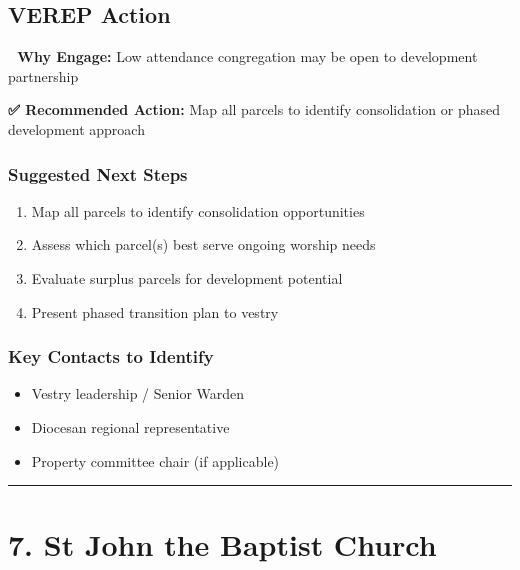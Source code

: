 \documentclass[
  letterpaper,
  DIV=11,
  numbers=noendperiod,
  oneside]{scrreprt}
\providecommand{\tightlist}{%
  \setlength{\itemsep}{0pt}\setlength{\parskip}{0pt}}
\begin{document}
\subsection{VEREP Action}

\textbf{🎯 Why Engage:} Low attendance congregation may be open to
development partnership

\textbf{✅ Recommended Action:} Map all parcels to identify
consolidation or phased development approach

\subsubsection{Suggested Next Steps}\label{suggested-next-steps-5}

\begin{enumerate}
\def\labelenumi{\arabic{enumi}.}
\tightlist
\item
  Map all parcels to identify consolidation opportunities
\item
  Assess which parcel(s) best serve ongoing worship needs
\item
  Evaluate surplus parcels for development potential
\item
  Present phased transition plan to vestry
\end{enumerate}

\subsubsection{Key Contacts to
Identify}\label{key-contacts-to-identify-5}

\begin{itemize}
\tightlist
\item[$\square$]
  Vestry leadership / Senior Warden
\item[$\square$]
  Diocesan regional representative
\item[$\square$]
  Property committee chair (if applicable)
\end{itemize}

\begin{center}\rule{0.5\linewidth}{0.5pt}\end{center}

\section*{7. St John the Baptist
Church}\label{st-john-the-baptist-church}
\end{document}
